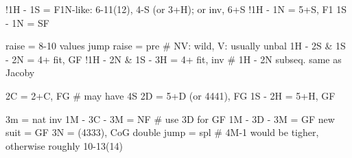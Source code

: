 !1H - 1S = F1N-like: 6-11(12), 4-S (or 3+H); or inv, 6+S
!1H - 1N = 5+S, F1
1S - 1N = SF

raise = 8-10 values
jump raise = pre  # NV: wild, V: usually unbal
1H - 2S & 1S - 2N = 4+ fit, GF 
!1H - 2N & 1S - 3H = 4+ fit, inv  # 1H - 2N subseq. same as Jacoby

2C = 2+C, FG  # may have 4S
2D = 5+D (or 4441), FG
1S - 2H = 5+H, GF

3m = nat inv
    1M - 3C - 3M = NF  # use 3D for GF
    1M - 3D - 3M = GF
    new suit = GF
3N = (4333), CoG
double jump = spl  # 4M-1 would be tigher, otherwise roughly 10-13(14)